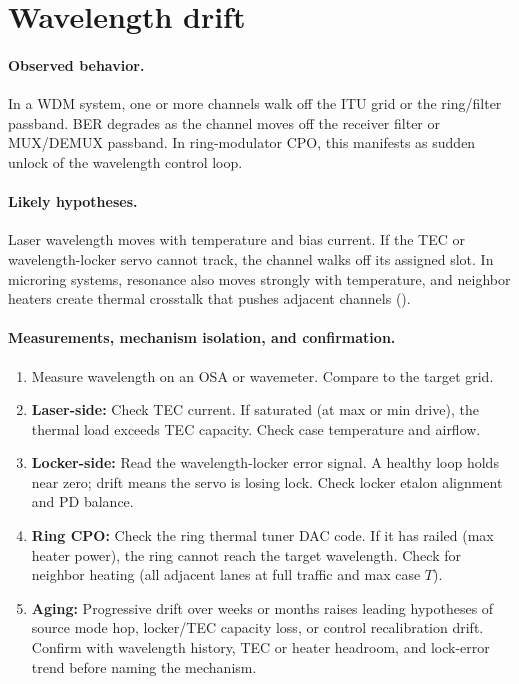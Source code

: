 \section{Wavelength drift}
\label{sec:fm-wavelength-drift}

\paragraph{Observed behavior.}
In a WDM system, one or more channels walk off the ITU grid or the ring/filter
passband. BER degrades as the channel moves off the receiver filter or MUX/DEMUX
passband. In ring-modulator CPO, this manifests as sudden unlock of the wavelength
control loop.

\paragraph{Likely hypotheses.}
Laser wavelength moves with temperature and bias current. If the TEC or
wavelength-locker servo cannot track, the channel walks off its assigned slot.
In microring systems, resonance also moves strongly with temperature, and
neighbor heaters create thermal crosstalk that pushes adjacent channels
().

\paragraph{Measurements, mechanism isolation, and confirmation.}
\begin{enumerate}
\item Measure wavelength on an OSA or wavemeter. Compare to the target grid.
\item \textbf{Laser-side:} Check TEC current. If saturated (at max or min drive),
      the thermal load exceeds TEC capacity. Check case temperature and airflow.
\item \textbf{Locker-side:} Read the wavelength-locker error signal. A healthy loop
      holds near zero; drift means the servo is losing lock. Check locker etalon
      alignment and PD balance.
\item \textbf{Ring CPO:} Check the ring thermal tuner DAC code. If it has railed
      (max heater power), the ring cannot reach the target wavelength. Check for
      neighbor heating (all adjacent lanes at full traffic and max case $T$).
\item \textbf{Aging:} Progressive drift over weeks or months raises leading
      hypotheses of source mode hop, locker/TEC capacity loss, or control
      recalibration drift. Confirm with wavelength history, TEC or heater headroom,
      and lock-error trend before naming the mechanism.
\end{enumerate}

